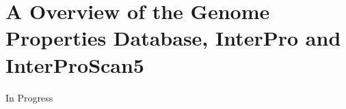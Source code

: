 \chapter{A Overview of the Genome Properties Database, InterPro and InterProScan5} \label{genome-properties-chapter} \label{genome-properties}

In Progress